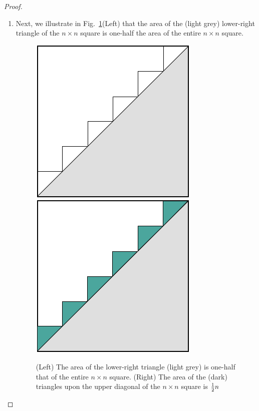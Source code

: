 \begin{proof}
\begin{enumerate}
\medskip\item
Next, we illustrate in Fig.~\ref{fig:sumIntegersGeo2}(Left) that the area of the (light grey) lower-right triangle of the $n \times n$ square is one-half the area of the entire $n \times n$ square.
\begin{figure}[htb]
\begin{center}
       \includegraphics[scale=0.33]{FiguresMaths/SumIntegersGeometricIntermediate}
       \hspace*{.25in}
        \includegraphics[scale=0.33]{FiguresMaths/SumIntegersGeometricFinal}
\end{center}
\caption{(Left) The area of the lower-right triangle (light grey) is one-half that of the entire $n \times n$ square.  (Right) The area of the (dark) triangles upon the upper diagonal of the $n \times n$ square is ${1 \over2} n$}
       \label{fig:sumIntegersGeo2}
\end{figure}


\end{enumerate}
\end{proof}

